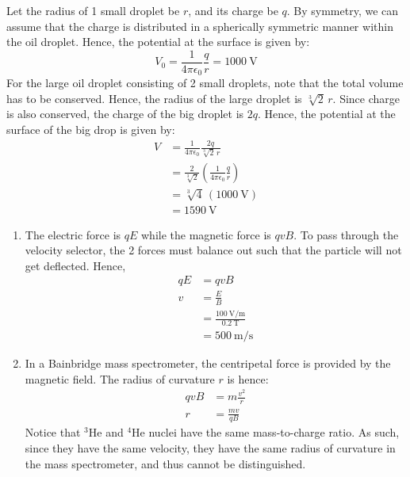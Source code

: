 \begin{solution}
    \begin{subsolution}
        Let the radius of 1 small droplet be $r$, and its charge be $q$. By symmetry, we can assume that the charge is distributed in a spherically symmetric manner within the oil droplet. Hence, the potential at the surface is given by:
        \[V_0=\frac{1}{4\pi\epsilon_0}\frac{q}{r}=\qty{1000}{\V}\]
        For the large oil droplet consisting of 2 small droplets, note that the total volume has to be conserved. Hence, the radius of the large droplet is \(\sqrt[3]{2}\,r\). Since charge is also conserved, the charge of the big droplet is \(2q\). Hence, the potential at the surface of the big drop is given by:
        \begin{align*}
            V&=\frac{1}{4\pi\epsilon_0}\frac{2q}{\sqrt[3]{2}\,r}\\
            &=\frac{2}{\sqrt[3]{2}}\left(\frac{1}{4\pi\epsilon_0}\frac{q}{r}\right)\\
            &=\sqrt[3]{4}\,(\qty{1000}{\V})\\
            &=\boxed{\qty{1590}{\V}}
        \end{align*}
    \end{subsolution}
    \tcblower
    \begin{subsolution}
        \renewcommand{\theenumi}{(\alph{enumi})}
        \begin{enumerate}
            \item The electric force is \(qE\) while the magnetic force is \(qvB\). To pass through the velocity selector, the 2 forces must balance out such that the particle will not get deflected. Hence,
            \begin{align*}
                qE&=qvB\\
                v&=\frac{E}{B}\\
                &=\frac{\qty{100}{\V\per\m}}{\qty{0.2}{\tesla}}\\
                &=\boxed{\qty{500}{\m\per\s}}
            \end{align*}
            \item In a Bainbridge mass spectrometer, the centripetal force is provided by the magnetic field. The radius of curvature $r$ is hence:
            \begin{align*}
                qvB&=m\frac{v^2}{r}\\
                r&=\frac{mv}{qB}
            \end{align*}
            Notice that ${}^{3}\mathrm{He}$ and ${}^{4}\mathrm{He}$ nuclei have the same mass-to-charge ratio. As such, since they have the same velocity, they have the same radius of curvature in the mass spectrometer, and thus $\boxed{\text{cannot}}$ be distinguished.
        \end{enumerate}
    \end{subsolution}
\end{solution}

